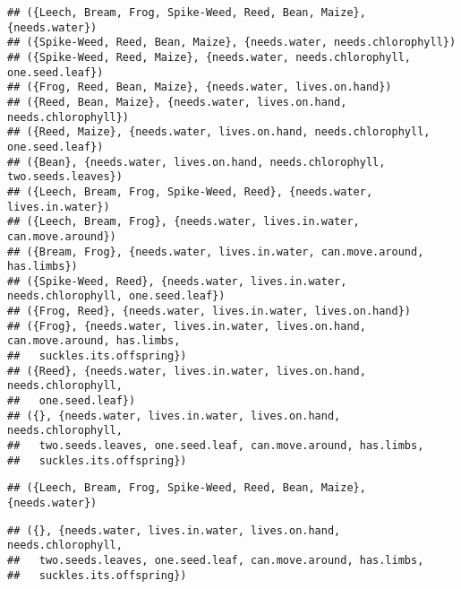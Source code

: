 \documentclass[
]{book}
\newenvironment{Shaded}{\begin{snugshade}}{\end{snugshade}}
\newcommand{\CommentTok}[1]{\textcolor[rgb]{0.56,0.35,0.01}{\textit{#1}}}
\newcommand{\FunctionTok}[1]{\textcolor[rgb]{0.00,0.00,0.00}{#1}}
\newcommand{\NormalTok}[1]{#1}
\newcommand{\SpecialCharTok}[1]{\textcolor[rgb]{0.00,0.00,0.00}{#1}}
\begin{document}
\begin{verbatim}
## ({Leech, Bream, Frog, Spike-Weed, Reed, Bean, Maize}, {needs.water})
## ({Spike-Weed, Reed, Bean, Maize}, {needs.water, needs.chlorophyll})
## ({Spike-Weed, Reed, Maize}, {needs.water, needs.chlorophyll, one.seed.leaf})
## ({Frog, Reed, Bean, Maize}, {needs.water, lives.on.hand})
## ({Reed, Bean, Maize}, {needs.water, lives.on.hand, needs.chlorophyll})
## ({Reed, Maize}, {needs.water, lives.on.hand, needs.chlorophyll, one.seed.leaf})
## ({Bean}, {needs.water, lives.on.hand, needs.chlorophyll, two.seeds.leaves})
## ({Leech, Bream, Frog, Spike-Weed, Reed}, {needs.water, lives.in.water})
## ({Leech, Bream, Frog}, {needs.water, lives.in.water, can.move.around})
## ({Bream, Frog}, {needs.water, lives.in.water, can.move.around, has.limbs})
## ({Spike-Weed, Reed}, {needs.water, lives.in.water, needs.chlorophyll, one.seed.leaf})
## ({Frog, Reed}, {needs.water, lives.in.water, lives.on.hand})
## ({Frog}, {needs.water, lives.in.water, lives.on.hand, can.move.around, has.limbs,
##   suckles.its.offspring})
## ({Reed}, {needs.water, lives.in.water, lives.on.hand, needs.chlorophyll,
##   one.seed.leaf})
## ({}, {needs.water, lives.in.water, lives.on.hand, needs.chlorophyll,
##   two.seeds.leaves, one.seed.leaf, can.move.around, has.limbs,
##   suckles.its.offspring})
\end{verbatim}

\begin{Shaded}
\end{Shaded}

\begin{verbatim}
## ({Leech, Bream, Frog, Spike-Weed, Reed, Bean, Maize}, {needs.water})
\end{verbatim}

\begin{Shaded}
\end{Shaded}

\begin{verbatim}
## ({}, {needs.water, lives.in.water, lives.on.hand, needs.chlorophyll,
##   two.seeds.leaves, one.seed.leaf, can.move.around, has.limbs,
##   suckles.its.offspring})
\end{verbatim}
\end{document}

